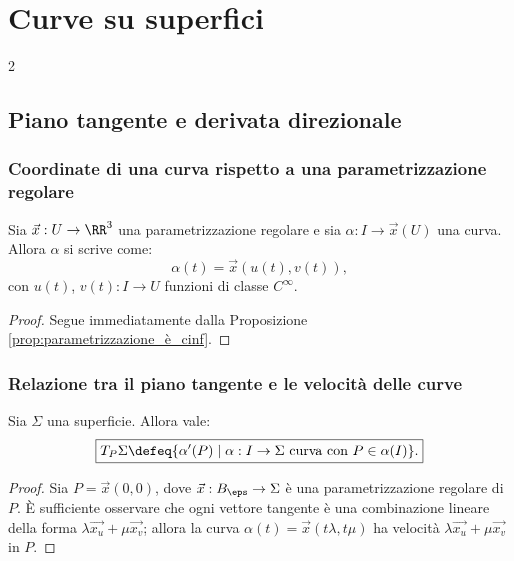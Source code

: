 \chapter{Curve su superfici}
\setlength{\parindent}{2pt}

\begin{multicols*}{2}
    \section{Piano tangente e derivata direzionale}

    \subsection{Coordinate di una curva rispetto a una parametrizzazione regolare}

    \begin{proposition} \label{prop:coordinate_curva_parametrizzazione}
        Sia $\vec{x} : U \to \RR^3$ una parametrizzazione regolare e sia $\alpha : I \to \vec{x}(U)$
        una curva. Allora $\alpha$ si scrive come:
        \[
            \alpha(t) = \vec{x}(u(t), v(t)),
        \]
        con $u(t)$, $v(t) : I \to U$ funzioni di classe $C^\infty$.
    \end{proposition}

    \begin{proof}
        Segue immediatamente dalla Proposizione \ref{prop:parametrizzazione_è_cinf}.
    \end{proof}

    \subsection{Relazione tra il piano tangente e le velocità delle curve}

    \begin{proposition}
        Sia $\Sigma$ una superficie. Allora vale:
        \[
            \boxed{T_P \Sigma \defeq \{ \alpha'(P) \mid \alpha : I \to \Sigma \textnormal{ curva con } P \in \alpha(I) \}.}
        \]
    \end{proposition}

    \begin{proof}
        Sia $P = \vec{x}(0, 0)$, dove $\vec{x} : B_\eps \to \Sigma$ è una parametrizzazione regolare di $P$.
        È sufficiente osservare che ogni vettore tangente è una combinazione lineare della forma
        $\lambda \vec{x_u} + \mu \vec{x_v}$; allora la curva
        $\alpha(t) = \vec{x}(t \lambda, t \mu)$ ha velocità $\lambda \vec{x_u} + \mu \vec{x_v}$ in
        $P$.
    \end{proof}


\end{multicols*}
